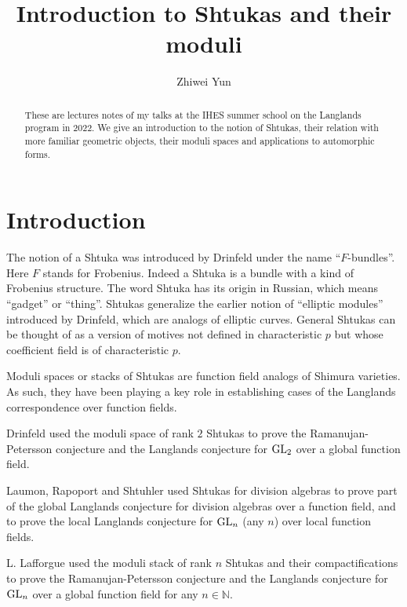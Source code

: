 \documentclass[11pt]{amsart}
\title{Introduction to Shtukas and their moduli}
\author{Zhiwei Yun}
\date{}
\numberwithin{equation}{section}
\theoremstyle{plain}
\theoremstyle{definition}
\def\NN{\mathbb{N}}
\newcommand\GL{\textup{GL}}
\begin{document}
\begin{abstract}
These are lectures notes of my talks at the IHES summer school on the Langlands program in 2022. We give an introduction to the notion of Shtukas,  their relation with more familiar geometric objects,  their moduli spaces and applications to automorphic forms. 
\end{abstract}

\maketitle
\tableofcontents

\section{Introduction}


The notion of a Shtuka was introduced by Drinfeld \cite{Dr-FBun} under the name ``$F$-bundles''. Here $F$ stands for Frobenius. Indeed a Shtuka is a bundle with a kind of Frobenius structure.  The word Shtuka has its origin in Russian, which means ``gadget'' or ``thing''. Shtukas generalize the earlier notion of ``elliptic modules'' introduced by Drinfeld, which are analogs of elliptic curves. General Shtukas can be thought of as a version of motives not defined in characteristic $p$ but whose coefficient field is of characteristic $p$.  %

Moduli spaces or stacks of Shtukas are function field analogs of Shimura varieties. As such, they have been playing a key role in establishing cases of the Langlands correspondence over function fields. 

Drinfeld \cite{Dr-Pet, Dr-comp} used the moduli space of rank $2$ Shtukas to prove the Ramanujan-Petersson  conjecture and the Langlands conjecture for $\GL_{2}$ over a global function field.  

Laumon, Rapoport and Shtuhler \cite{LRS} used Shtukas for division algebras to prove part of the global Langlands conjecture for division algebras over a function field, and to prove the local Langlands conjecture for $\GL_{n}$ (any $n$) over local function fields.

L. Lafforgue \cite{LLaff} used the moduli stack of rank $n$ Shtukas and their compactifications to prove the Ramanujan-Petersson conjecture and the Langlands conjecture for $\GL_{n}$ over a global function field for any $n\in\NN$. 
\end{document}
